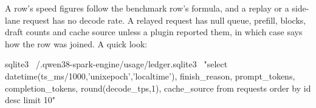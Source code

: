 

A row's speed figures follow the benchmark row's formula, and a replay or a side-lane request has no decode rate. A relayed request has null queue, prefill, blocks, draft counts and cache source unless a plugin reported them, in which case  says how the row was joined. A quick look:

\begin{shell}
sqlite3 ~/.qwen38-spark-engine/usage/ledger.sqlite3 \
  "select datetime(ts_ms/1000,'unixepoch','localtime'), finish_reason, prompt_tokens,
          completion_tokens, round(decode_tps,1), cache_source from requests order by id desc limit 10"
\end{shell}
